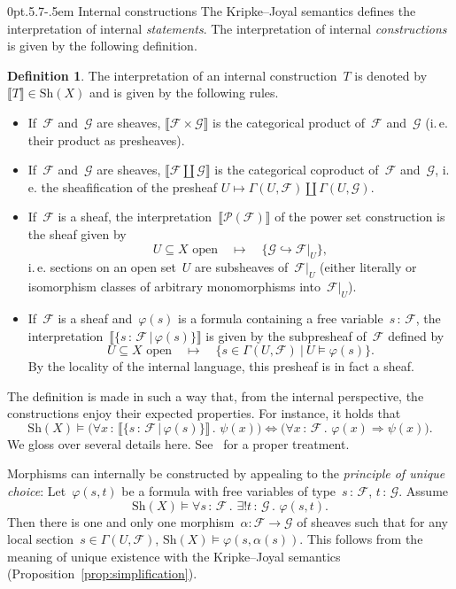 \documentclass[10pt,reqno,a4paper]{amsbook}
\makeatletter
\theoremstyle{definition}
\newtheorem{defn}{Definition}[section]
\theoremstyle{plain}
\theoremstyle{remark}
\newcommand{\F}{\mathcal{F}}
\newcommand{\G}{\mathcal{G}}
\renewcommand{\P}{\mathcal{P}}
\newcommand{\Sh}{\mathrm{Sh}}
\newcommand{\?}{\,{:}\,}
\renewcommand{\_}{\mathpunct{.}\,}
\newcommand{\brak}[1]{{\llbracket{#1}\rrbracket}}
\newcommand{\ie}{i.\,e.\@\xspace}
\def\subsection{\@startsection{subsection}{2}%
  {0pt}{.5\linespacing\@plus.7\linespacing}{-.5em}%
  {\normalfont\bfseries}}
\makeatother
\begin{document}
\subsection{Internal constructions}
\label{sect:internal-constructions}
The Kripke--Joyal semantics defines the
interpretation of internal \emph{statements}. The interpretation of internal
\emph{constructions} is given by the following definition.

\begin{defn}\label{defn:interpretation-internal-constructions}
The interpretation of an internal construction~$T$
is denoted by~$\brak{T} \in \Sh(X)$ and is given by the following rules.
\begin{itemize}\item If~$\F$ and~$\G$ are sheaves, $\brak{\F \times \G}$ is the
categorical product of~$\F$ and~$\G$ (\ie their product as presheaves).
\item If~$\F$ and~$\G$ are sheaves, $\brak{\F \amalg \G}$ is the categorical
coproduct of~$\F$ and~$\G$, \ie the sheafification of the presheaf
$U \mapsto \Gamma(U,\F) \amalg \Gamma(U,\G)$.
\item If~$\F$ is a sheaf, the interpretation~$\brak{\P(\F)}$ of the power set
construction is the sheaf given by
\[ \text{$U \subseteq X$ open} \quad\longmapsto\quad \{ \G \hookrightarrow \F|_U \}, \]
\ie sections on an open set~$U$ are subsheaves of~$\F|_U$ (either literally
or isomorphism classes of arbitrary monomorphisms into~$\F|_U$).
\item If~$\F$ is a sheaf and~$\varphi(s)$ is a formula containing a free
variable~$s\?\F$, the interpretation~$\brak{\{s\?\F\,|\,\varphi(s)\}}$ is given
by the subpresheaf of~$\F$ defined by
\[ \text{$U \subseteq X$ open} \quad\longmapsto\quad \{ s \in \Gamma(U,\F) \ |\
  U \models \varphi(s) \}. \]
By the locality of the internal language, this presheaf is in fact a
sheaf.
\end{itemize}
\end{defn}

The definition is made in such a way that, from the internal perspective, the
constructions enjoy their expected properties. For instance, it holds that
\[ \Sh(X) \models
  \bigl(\forall x\?\brak{\{s\?\F \,|\, \varphi(s)\}}\_ \psi(x)\bigr)
  \Longleftrightarrow
  \bigl(\forall x\?\F\_ \varphi(x) \Rightarrow \psi(x)\bigr). \]
We gloss over several details here. See~\cite[Section~D4.1]{johnstone:elephant} for
a proper treatment.

Morphisms can internally be constructed by appealing to the \emph{principle of
unique choice}: Let~$\varphi(s,t)$ be a formula with free variables of
type~$s\?\F$, $t\?\G$. Assume
\[ \Sh(X) \models \forall s\?\F\_ \exists!t\?\G\_ \varphi(s,t). \]
Then there is one and only one morphism~$\alpha : \F \to \G$ of sheaves such
that for any local section~$s \in \Gamma(U,\F)$, $\Sh(X) \models
\varphi(s,\alpha(s))$. This follows from the meaning of unique existence with
the Kripke--Joyal semantics (Proposition~\ref{prop:simplification}).
\end{document}
